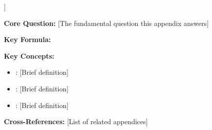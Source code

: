 
\begin{tcolorbox}[colback=blue!5!white, colframe=blue!75!black, 
    title=Quick Reference: [Appendix Name]]

\textbf{Core Question:} [The fundamental question this appendix answers]

\textbf{Key Formula:}
\begin{equation}
[The most important equation]
\end{equation}

\textbf{Key Concepts:}
\begin{itemize}[nosep]
\item [Concept 1]: [Brief definition]
\item [Concept 2]: [Brief definition]
\item [Concept 3]: [Brief definition]
\end{itemize}

\textbf{Cross-References:} [List of related appendices]
\end{tcolorbox}

%
%

